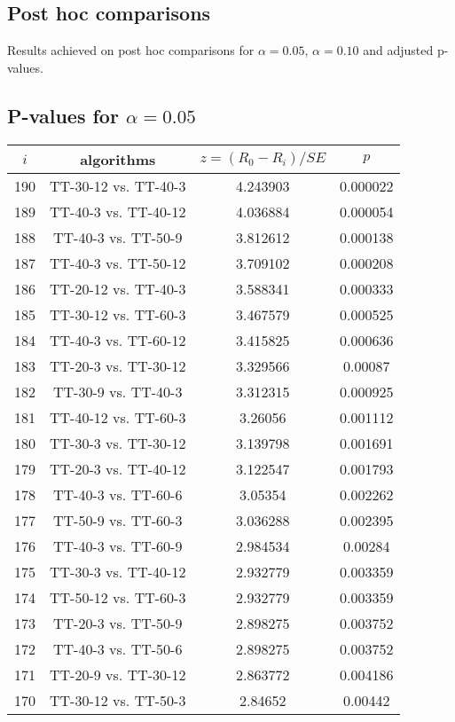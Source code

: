 \documentclass[a4paper,10pt]{article}
\begin{document}
\begin{landscape}
\pagebreak

\section{Post hoc comparisons}

Results achieved on post hoc comparisons for $\alpha = 0.05$, $\alpha = 0.10$ and adjusted p-values.

\subsection{P-values for $\alpha=0.05$}

\begin{table}[!htp]
\centering\scriptsize
\begin{tabular}{cccc}
$i$&algorithms&$z=(R_0 - R_i)/SE$&$p$\\
\hline190&TT-30-12 vs. TT-40-3&4.243903&0.000022\\
189&TT-40-3 vs. TT-40-12&4.036884&0.000054\\
188&TT-40-3 vs. TT-50-9&3.812612&0.000138\\
187&TT-40-3 vs. TT-50-12&3.709102&0.000208\\
186&TT-20-12 vs. TT-40-3&3.588341&0.000333\\
185&TT-30-12 vs. TT-60-3&3.467579&0.000525\\
184&TT-40-3 vs. TT-60-12&3.415825&0.000636\\
183&TT-20-3 vs. TT-30-12&3.329566&0.00087\\
182&TT-30-9 vs. TT-40-3&3.312315&0.000925\\
181&TT-40-12 vs. TT-60-3&3.26056&0.001112\\
180&TT-30-3 vs. TT-30-12&3.139798&0.001691\\
179&TT-20-3 vs. TT-40-12&3.122547&0.001793\\
178&TT-40-3 vs. TT-60-6&3.05354&0.002262\\
177&TT-50-9 vs. TT-60-3&3.036288&0.002395\\
176&TT-40-3 vs. TT-60-9&2.984534&0.00284\\
175&TT-30-3 vs. TT-40-12&2.932779&0.003359\\
174&TT-50-12 vs. TT-60-3&2.932779&0.003359\\
173&TT-20-3 vs. TT-50-9&2.898275&0.003752\\
172&TT-40-3 vs. TT-50-6&2.898275&0.003752\\
171&TT-20-9 vs. TT-30-12&2.863772&0.004186\\
170&TT-30-12 vs. TT-50-3&2.84652&0.00442\\

\end{tabular}
\end{table}
\end{landscape}
\end{document}
